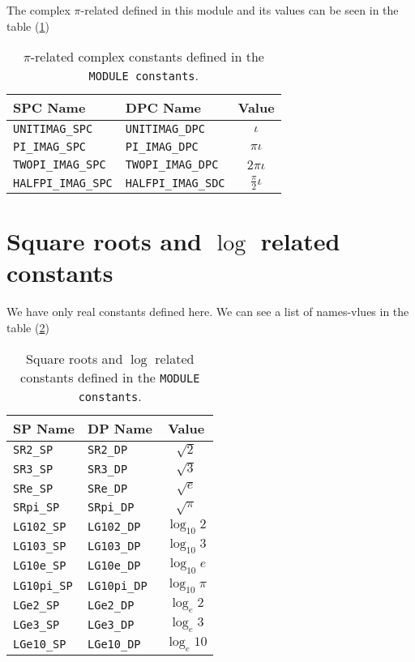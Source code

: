 The complex $\pi$-related defined in this module and its values can be
seen in the table (\ref{tab:picteC})

\begin{table}[htbp]
  \centering
  \begin{tabular}{|l|l|c|}
    \hline
    \textbf{SPC Name} & \textbf{DPC Name} & \textbf{Value} \\
    \hline
    \hline
    \texttt{UNITIMAG\_SPC} & \texttt{UNITIMAG\_DPC} & $\iota$ \\
    \hline
    \texttt{PI\_IMAG\_SPC} & \texttt{PI\_IMAG\_DPC} & $\pi\iota$ \\
    \hline
    \texttt{TWOPI\_IMAG\_SPC} & \texttt{TWOPI\_IMAG\_DPC} & $2\pi\iota$ \\
    \hline
    \texttt{HALFPI\_IMAG\_SPC} & \texttt{HALFPI\_IMAG\_SDC} & $\frac{\pi}{2}\iota$ \\
    \hline
  \end{tabular}
  \caption{$\pi$-related complex constants defined in the \texttt{MODULE constants}.}
  \label{tab:picteC}
\end{table}


\section{Square roots and $\log$ related constants}

We have only real constants defined here. We can see a list of
names-vlues in the table (\ref{tab:logcte})

\begin{table}[htbp]
  \centering
  \begin{tabular}{|l|l|c|}
    \hline
    \textbf{SP Name} & \textbf{DP Name} & \textbf{Value} \\
    \hline
    \hline
    \texttt{SR2\_SP} & \texttt{SR2\_DP} & $\sqrt{2}$ \\
    \hline
    \texttt{SR3\_SP} & \texttt{SR3\_DP} & $\sqrt{3}$ \\
    \hline
    \texttt{SRe\_SP} & \texttt{SRe\_DP} & $\sqrt{e}$ \\
    \hline
    \texttt{SRpi\_SP} & \texttt{SRpi\_DP} & $\sqrt{\pi}$ \\
    \hline
    \texttt{LG102\_SP} & \texttt{LG102\_DP} & $\log_{10}{2}$ \\
    \hline
    \texttt{LG103\_SP} & \texttt{LG103\_DP} & $\log_{10}{3}$ \\
    \hline
    \texttt{LG10e\_SP} & \texttt{LG10e\_DP} & $\log_{10}{e}$ \\
    \hline
    \texttt{LG10pi\_SP} & \texttt{LG10pi\_DP} & $\log_{10}{\pi}$ \\
    \hline
    \texttt{LGe2\_SP} & \texttt{LGe2\_DP} & $\log_e{2}$ \\
    \hline
    \texttt{LGe3\_SP} & \texttt{LGe3\_DP} & $\log_e{3}$ \\
    \hline
    \texttt{LGe10\_SP} & \texttt{LGe10\_DP} & $\log_e{10}$ \\
    \hline
  \end{tabular}
  \caption{Square roots and $\log$ related constants defined in the \texttt{MODULE constants}.}
  \label{tab:logcte}
\end{table}


